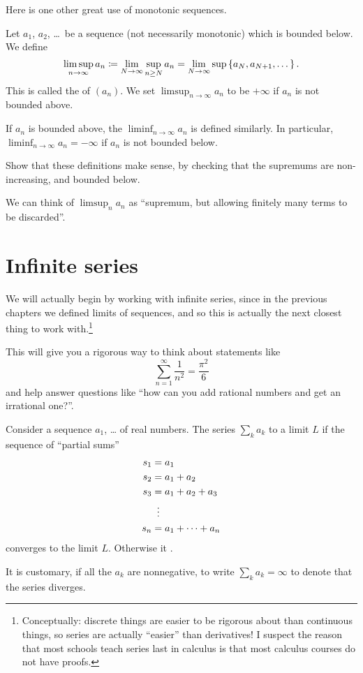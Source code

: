 Here is one other great use of monotonic sequences.
\begin{definition}
	Let $a_1$, $a_2$, \dots\ be a sequence
	(not necessarily monotonic) which is bounded below.
	We define
	\[
		\limsup_{n \to \infty} a_n
		\coloneqq \lim_{N \to \infty} \sup_{n \ge N} a_n
		= \lim_{N \to \infty} \sup \left\{ a_N, a_{N+1}, \dots \right\}.
	\]
	This is called the  of $(a_n)$.
	We set $\limsup_{n \to \infty} a_n$ to be $+\infty$
	if $a_n$ is not bounded above.

	If $a_n$ is bounded above,
	the  $\liminf_{n \to \infty} a_n$
	is defined similarly.
	In particular, $\liminf_{n \to \infty} a_n = -\infty$
	if $a_n$ is not bounded below.
\end{definition}
\begin{exercise}
	Show that these definitions make sense,
	by checking that the supremums are non-increasing,
	and bounded below.
\end{exercise}
We can think of $\limsup_n a_n$ as
``supremum, but allowing finitely many terms to be discarded''.


\section{Infinite series}

We will actually begin by working with infinite series,
since in the previous chapters we defined limits of sequences,
and so this is actually the next closest thing to work
with.\footnote{Conceptually: discrete things are easier
	to be rigorous about than continuous things,
	so series are actually ``easier'' than derivatives!
	I suspect the reason that most schools teach series last in calculus
	is that most calculus courses do not have proofs.}

This will give you a rigorous way to think about
statements like
\[ \sum_{n = 1}^{\infty} \frac{1}{n^2} = \frac{\pi^2}{6} \]
and help answer questions like
``how can you add rational numbers and get an irrational one?''.

\begin{definition}
	Consider a sequence $a_1$, \dots{} of real numbers.
	The series $\sum_k a_k$  to a limit $L$ if
	the sequence of ``partial sums''
	\begin{align*}
		s_1 &= a_1 \\
		s_2 &= a_1 + a_2 \\
		s_3 &= a_1 + a_2 + a_3 \\
		&\vdotswithin= \\
		s_n &= a_1 + \dots + a_n
	\end{align*}
	converges to the limit $L$.
	Otherwise it .
\end{definition}
\begin{abuse}
	It is customary, if all the $a_k$ are nonnegative,
	to write $\sum_k a_k = \infty$ to denote that the series diverges.
\end{abuse}

